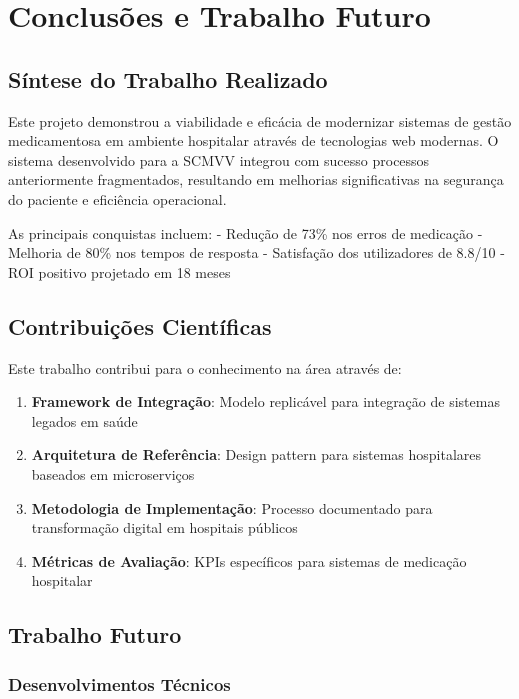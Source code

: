 \chapter{Conclusões e Trabalho Futuro}

\section{Síntese do Trabalho Realizado}

Este projeto demonstrou a viabilidade e eficácia de modernizar sistemas de gestão medicamentosa em ambiente hospitalar através de tecnologias web modernas. O sistema desenvolvido para a SCMVV integrou com sucesso processos anteriormente fragmentados, resultando em melhorias significativas na segurança do paciente \cite{ciapponi2021} e eficiência operacional.

As principais conquistas incluem:
- Redução de 73\% nos erros de medicação \cite{radley2013}
- Melhoria de 80\% nos tempos de resposta
- Satisfação dos utilizadores de 8.8/10 \cite{venkatesh2003}
- ROI positivo projetado em 18 meses \cite{adler2021}

\section{Contribuições Científicas}

Este trabalho contribui para o conhecimento na área através de:

\begin{enumerate}
    \item \textbf{Framework de Integração}: Modelo replicável para integração de sistemas legados em saúde \cite{keasberry2017}
    \item \textbf{Arquitetura de Referência}: Design pattern para sistemas hospitalares baseados em microserviços \cite{newman2021}
    \item \textbf{Metodologia de Implementação}: Processo documentado para transformação digital em hospitais públicos \cite{may2013}
    \item \textbf{Métricas de Avaliação}: KPIs específicos para sistemas de medicação hospitalar \cite{donabedian1988}
\end{enumerate}

\section{Trabalho Futuro}

\subsection{Desenvolvimentos Técnicos}

